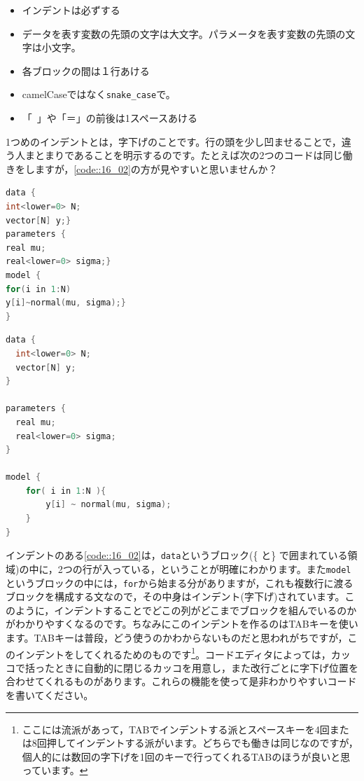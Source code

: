\documentclass{ltjsbook}
\begin{document}
\begin{itemize}
    \item インデントは必ずする
    \item データを表す変数の先頭の文字は大文字。パラメータを表す変数の先頭の文字は小文字。
    \item 各ブロックの間は１行あける
    \item camelCaseではなく\verb|snake_case|で。
    \item 「~」や「＝」の前後は1スペースあける
\end{itemize}

1つめのインデントとは，字下げのことです。行の頭を少し凹ませることで，違う人まとまりであることを明示するのです。たとえば次の2つのコードは同じ働きをしますが，\ref{code::16_02}の方が見やすいと思いませんか？
\begin{lstlisting}[language=c++,label={code::16_01},caption={インデントのないコード}]
data {
int<lower=0> N;
vector[N] y;}
parameters {
real mu;
real<lower=0> sigma;}
model {
for(i in 1:N)
y[i]~normal(mu, sigma);}
}
\end{lstlisting}


\begin{lstlisting}[language=c++,label={code::16_02},caption={インデントのあるコード}]
data {
  int<lower=0> N;
  vector[N] y;
}

parameters {
  real mu;
  real<lower=0> sigma;
}

model {
    for( i in 1:N ){
        y[i] ~ normal(mu, sigma);
    }
}
\end{lstlisting}
インデントのある\ref{code::16_02}は，\texttt{data}というブロック(\{ と\} で囲まれている領域)の中に，2つの行が入っている，ということが明確にわかります。また\texttt{model}というブロックの中には，\texttt{for}から始まる分がありますが，これも複数行に渡るブロックを構成する文なので，その中身はインデント(字下げ)されています。このように，インデントすることでどこの列がどこまでブロックを組んでいるのかがわかりやすくなるのです。ちなみにこのインデントを作るのはTABキーを使います。TABキーは普段，どう使うのかわからないものだと思われがちですが，このインデントをしてくれるためのものです\footnote{ここには流派があって，TABでインデントする派とスペースキーを4回または8回押してインデントする派がいます。どちらでも働きは同じなのですが，個人的には数回の字下げを1回のキーで行ってくれるTABのほうが良いと思っています。}。コードエディタによっては，カッコで括ったときに自動的に閉じるカッコを用意し，また改行ごとに字下げ位置を合わせてくれるものがあります。これらの機能を使って是非わかりやすいコードを書いてください。
\end{document}
